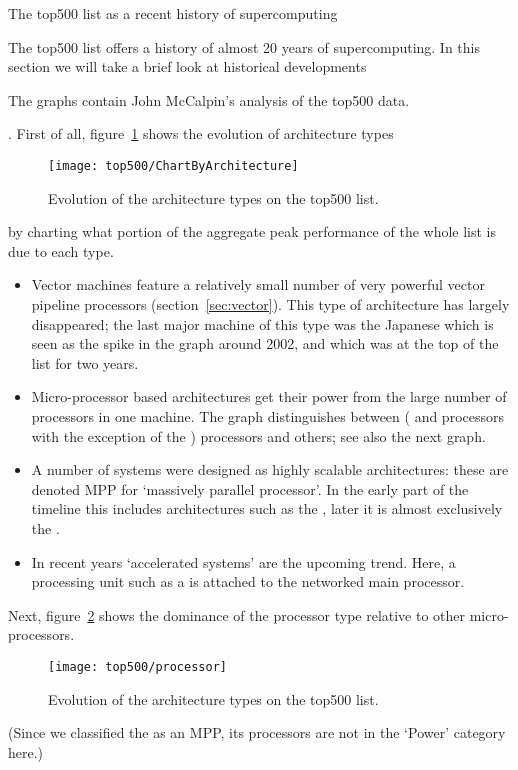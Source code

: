  {The top500 list as a recent history of supercomputing}

The top500 list offers a history of almost 20 years of
supercomputing. In this section we will take a brief look at
historical developments
\begin{footnoteenv}
  {The graphs contain John McCalpin's
    analysis of the top500 data.}
\end{footnoteenv}%
. First of all,
figure~\ref{fig:top500-types} shows the evolution of architecture types
\begin{figure}[ht]
  \texttt{[image: top500/ChartByArchitecture]}
  \caption{Evolution of the architecture types on the top500 list.}
  \label{fig:top500-types}
\end{figure}
by charting what portion of the aggregate peak performance of the
whole list is due to each type.
\begin{itemize}
\item Vector machines feature a relatively small number of very powerful vector
  pipeline processors (section~\ref{sec:vector}). This type of
  architecture has largely disappeared; the last major machine of this
  type was the Japanese  which is seen as
  the spike in the graph around 2002, and which was at the top of the
  list for two years.
\item Micro-processor based architectures get their power from the
  large number of processors in one machine. The graph distinguishes
  between  ( and 
  processors with the exception of the )
  processors and others; see also the next graph.
\item A number of systems were designed as highly scalable
  architectures: these are denoted MPP for `massively parallel
  processor'. In the early part of the timeline this includes
  architectures such as the , later it
  is almost exclusively the .
\item In recent years `accelerated systems' are the upcoming
  trend. Here, a processing unit such as a  is attached
  to the networked main processor.
\end{itemize}
Next, figure~\ref{fig:top500-processor} shows the dominance of the
 processor type relative to other micro-processors.
\begin{figure}[ht]
  \texttt{[image: top500/processor]}
  \caption{Evolution of the architecture types on the top500 list.}
  \label{fig:top500-processor}
\end{figure}
(Since we classified the  as an MPP, its
processors are not in the `Power' category here.)

